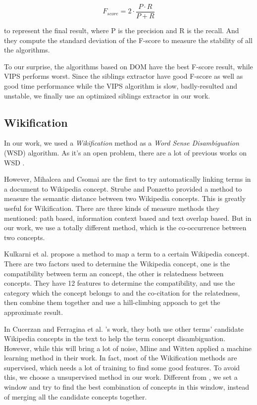 $$F_{score} = 2 \cdot \frac{P \cdot R}{P + R}$$

to represent the final result, where P is the precision and R is the recall.
And they compute the standard deviation of the F-score to measure the stability
of all the algorithms.

To our surprise, the algorithms based on DOM have the best F-score result, while
VIPS performs worst. Since the siblings extractor have good F-score as well
as good time performance while the VIPS algorithm is slow, badly-resulted and
unstable, we finally use an optimized siblings extractor in our work.


\subsection{Wikification}
\label{wikification}

In our work, we used a \textit{Wikification} method as a
\textit{Word Sense Disambiguation} (WSD) algorithm. As it's an open problem,
there are a lot of previous works on WSD \cite{GuthrieGWA91,Li1998:wcd,ChungKML01,Stokoe2003:WSD,Fernandez-AmorosGSS10}.

However, Mihalcea and Csomai \cite{MihalceaC07} are the first to try
automatically linking terms in a document to Wikipedia concept. Strube and
Ponzetto \cite{StrubeP06} provided a method to measure the semantic distance
between two Wikipedia concepts. This is greatly useful for Wikification. There
are three kinds of measure methods they mentioned: path based, information
context based and text overlap based. But in our work, we use a totally
different method, which is the co-occurrence between two concepts.

Kulkarni et al. \cite{kulkarni2009collective} propose a method to map a term to
a certain Wikipedia concept. There are two factors used to determine the
Wikipedia concept, one is the compatibility between term an concept, the other
is relatedness between concepts. They have 12 features to determine the
compatibility, and use the category which the concept belongs to and the
co-citation for the relatedness, then combine them together and use a
hill-climbing appoach to get the approximate result.

In Cucerzan \cite{cucerzan2007large} and Ferragina et al. \cite{ferragina2010tagme}'s
work, they both use other terms' candidate Wikipedia concepts in the text to
help the term concept disambiguation. However, while this will bring a lot of
noise, Mline and Witten \cite{lui2011generation} applied a machine learning
method in their work. In fact, most of the Wikification methods are supervised,
which needs a lot of training to find some good features. To avoid this, we
choose a unsupervised method in our work. Different from \cite{cucerzan2007large,ferragina2010tagme},
we set a window and try to find the best combination of concepts in this window,
instead of merging all the candidate concepts together.
